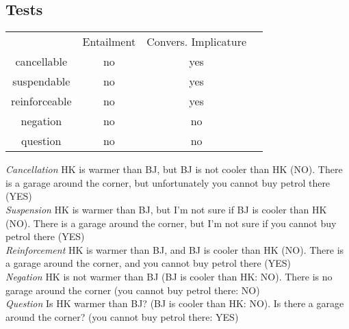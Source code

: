 \subsection*{Tests}
\begin{tabular}{c c c c}
 &Entailment&Convers. Implicature&\\
cancellable&no&yes&\\
suspendable&no&yes&\\
reinforceable&no&yes&\\
negation&no&no&\\
question&no&no&\\
\end{tabular}
\emph{Cancellation} {\tiny HK is warmer than BJ, but BJ is not cooler than HK (NO). There is a garage around the corner, but unfortunately you cannot buy petrol there (YES)}\\
\emph{Suspension} {\tiny HK is warmer than BJ, but I'm not sure if BJ is cooler than HK (NO). There is a garage around the corner, but I'm not sure if you cannot buy petrol there (YES)}\\
\emph{Reinforcement} {\tiny HK is warmer than BJ, and BJ is cooler than HK (NO). There is a garage around the corner, and you cannot buy petrol there (YES)}\\
\emph{Negation} {\tiny HK is not warmer than BJ (BJ is cooler than HK: NO). There is no garage around the corner (you cannot buy petrol there: NO)}\\
\emph{Question} {\tiny Is HK warmer than BJ? (BJ is cooler than HK: NO). Is there a garage around the corner? (you cannot buy petrol there: YES)}\\